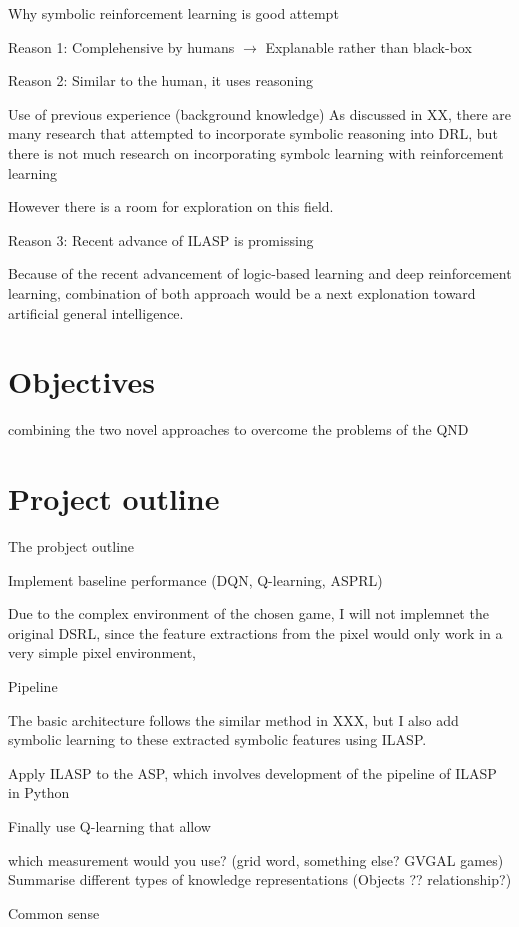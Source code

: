 \documentclass[12pt,twoside]{report}
\begin{document}
Why symbolic reinforcement learning is good attempt


Reason 1: Complehensive by humans $\rightarrow$ Explanable rather than black-box

Reason 2: Similar to the human, it uses reasoning

Use of previous experience (background knowledge)
As discussed in XX, there are many research that attempted to incorporate symbolic reasoning into DRL, but there is not much research on incorporating symbolc learning with reinforcement learning

However there is a room for exploration on this field.

Reason 3: Recent advance of ILASP is promissing

Because of the recent advancement of logic-based learning and deep reinforcement learning, combination of both approach would be a next explonation toward artificial general intelligence.

\section{Objectives}

combining the two novel approaches to overcome the problems of the QND

\section{Project outline}

The probject outline

Implement baseline performance (DQN, Q-learning, ASPRL)

Due to the complex environment of the chosen game, I will not implemnet the original DSRL, since the feature extractions from the pixel would only work in a very simple pixel environment,

Pipeline

The basic architecture follows the similar method in XXX, but I also add symbolic learning to these extracted symbolic features using ILASP.

Apply ILASP to the ASP, which involves development of the pipeline of ILASP in Python

Finally use Q-learning that allow

which measurement would you use? (grid word, something else? GVGAL games)
Summarise different types of knowledge representations (Objects ?? relationship?)

Common sense
\end{document}
